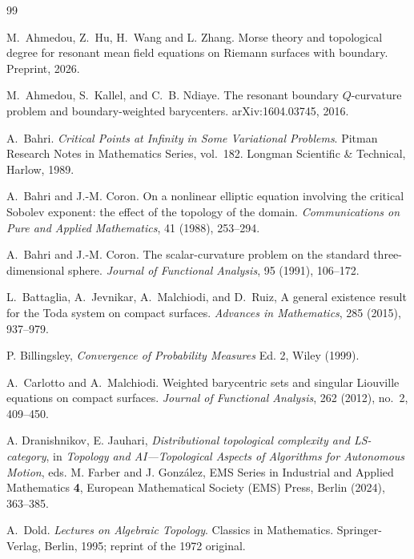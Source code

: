 \documentclass[11pt,a4paper]{article}
\numberwithin{equation}{section}
\theoremstyle{definition}
\theoremstyle{remark}
\begin{document}
\begin{thebibliography}{99}
\small

M.~Ahmedou, Z.~Hu,  H.~Wang and L. Zhang.
\newblock Morse theory and topological degree for resonant mean field equations on Riemann surfaces with boundary.
\newblock Preprint, 2026.

M.~Ahmedou, S.~Kallel, and C.~B. Ndiaye.
\newblock The resonant boundary {$Q$}-curvature problem and boundary-weighted barycenters.
\newblock arXiv:1604.03745, 2016.

A.~Bahri.
\newblock \emph{Critical Points at Infinity in Some Variational Problems}.
\newblock Pitman Research Notes in Mathematics Series, vol.~182. Longman Scientific \& Technical, Harlow, 1989.

A.~Bahri and J.-M. Coron.
\newblock On a nonlinear elliptic equation involving the critical Sobolev exponent: the effect of the topology of the domain.
\newblock \emph{Communications on Pure and Applied Mathematics}, 41 (1988), 253--294.

A.~Bahri and J.-M. Coron.
\newblock The scalar-curvature problem on the standard three-dimensional sphere.
\newblock \emph{Journal of Functional Analysis}, 95 (1991), 106--172.

L.~Battaglia, A.~Jevnikar, A.~Malchiodi, and D.~Ruiz,
\newblock A general existence result for the Toda system on compact surfaces.
\newblock \emph{Advances in Mathematics}, 285 (2015), 937--979.

 P. Billingsley, \textit{Convergence of Probability Measures} {Ed. 2},
Wiley (1999).

A.~Carlotto and A.~Malchiodi.
\newblock Weighted barycentric sets and singular Liouville equations on compact surfaces.
\newblock \emph{Journal of Functional Analysis}, 262 (2012), no.~2, 409--450.

 A. Dranishnikov, E. Jauhari, 
\textit{Distributional topological complexity and LS-category}, in \emph{Topology and AI---Topological Aspects of Algorithms for Autonomous Motion}, eds. M. Farber and J. Gonz\'alez, EMS Series in Industrial and Applied Mathematics {\bf 4}, European Mathematical Society (EMS) Press, Berlin (2024), 363--385.

A.~Dold.
\newblock \emph{Lectures on Algebraic Topology}.
\newblock Classics in Mathematics. Springer-Verlag, Berlin, 1995; reprint of the 1972 original.


\end{thebibliography}
\end{document}
